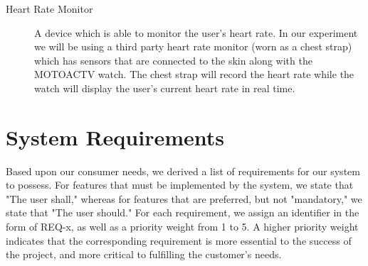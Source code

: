 \documentclass[letterpaper,english, 12pt]{scrreprt}
\begin{document}
\begin{description}
	\item[Heart Rate Monitor] A device which is able to monitor the user's heart rate. In our experiment we will be using a third party heart rate monitor (worn as a chest strap) which has sensors that are connected to the skin along with the MOTOACTV watch. The chest strap will record the heart rate while the watch will display the user's current heart rate in real time.
\end{description}

\chapter{System Requirements}
Based upon our consumer needs, we derived a list of requirements for our system to
possess. For features that must be implemented by the system, we state that "The
user shall," whereas for features that are preferred, but not "mandatory," we state
that "The user should." For each requirement, we assign an identifier in the form of
REQ-x, as well as a priority weight from 1 to 5. A higher priority weight indicates
that the corresponding requirement is more essential to the success of the project,
and more critical to fulfilling the customer's needs.
\end{document}

